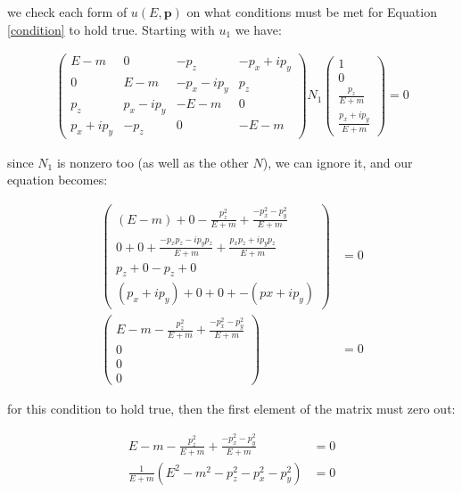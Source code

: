\documentclass[11pt]{article}
\theoremstyle{definition}
\begin{document}
we check each form of $u(E,\mathbf{p})$ on what conditions must be met for Equation \ref{condition} to hold true. Starting with $u_1$ we have:

\begin{align}
        \begin{pmatrix}
            E-m & 0 & -p_{z} & - p_{x} + ip_{y}\\
            0 & E-m & - p_{x} - ip_{y} & p_{z}\\
            p_{z} & p_{x} - ip_{y} & -E-m & 0\\
            p_{x} + ip_{y} & -p_{z} & 0 & -E-m
        \end{pmatrix}
        N_1
        \begin{pmatrix}
            1\\
            0\\
            \frac{p_z}{E+m}\\
            \frac{p_x + ip_y}{E+m}
        \end{pmatrix}  = 0
\end{align}

since $N_1$ is nonzero too (as well as the other $N$), we can ignore it, and our equation becomes:

\begin{align}
    \begin{pmatrix}
        (E-m) + 0 - \frac{p_{z}^2}{E+m} + \frac{-p_{x}^2 - p_{y}^2}{E+m}\\
        0 + 0 + \frac{-p_xp_z - ip_yp_z}{E+m} + \frac{p_xp_z + ip_yp_z}{E+m}\\
        p_z + 0 - p_z + 0\\
        (p_x + ip_y) + 0 + 0 + -(px+ip_y)
    \end{pmatrix}
    &= 0\\
    \begin{pmatrix}
        E-m - \frac{p_{z}^2}{E+m} + \frac{-p_{x}^2 - p_{y}^2}{E+m}\\
        0\\
        0\\
        0
    \end{pmatrix}
    &=0
\end{align}

for this condition to hold true, then the first element of the matrix must zero out:

\begin{align}
    E-m - \frac{p_{z}^2}{E+m} + \frac{-p_{x}^2 - p_{y}^2}{E+m} &= 0\\
    \frac{1}{E+m} \left( E^2-m^2 - p_z^2 - p_x^2 - p_y^2 \right) &= 0 
\end{align}
\end{document}
